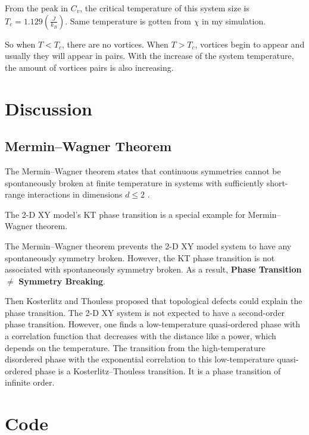 \documentclass[a4paper]{article}
\begin{document}
From the peak in $C_v$, the critical temperature of this system size is $T_c = 1.129 (\displaystyle \frac{J}{k_B})$. Same temperature is gotten from $\chi$ in my simulation.

So when $T < T_c$, there are no vortices. When $T > T_c$, vortices begin to appear and usually they will appear in pairs. With the increase of the system temperature, the amount of vortices pairs is also increasing.

\section{Discussion}

\subsection{Mermin–Wagner Theorem}

The Mermin–Wagner theorem states that continuous symmetries cannot be spontaneously broken at finite temperature in systems with sufficiently short-range interactions in dimensions $d \leq 2$ \cite{mermin1966absence}. 

The 2-D XY model's KT phase transition is a special example for Mermin–Wagner theorem.

The Mermin–Wagner theorem prevents the 2-D XY model system to have any spontaneously symmetry broken. However, the KT phase transition is not associated with spontaneously symmetry broken. As a result, \textbf{Phase Transition} $\neq$ \textbf{Symmetry Breaking}.

Then Kosterlitz and Thouless proposed that topological defects could explain the phase transition. The 2-D XY system is not expected to have a second-order phase transition. However, one finds a low-temperature quasi-ordered phase with a correlation function that decreases with the distance like a power, which depends on the temperature. The transition from the high-temperature disordered phase with the exponential correlation to this low-temperature quasi-ordered phase is a Kosterlitz–Thouless transition. It is a phase transition of infinite order.



\section{Code}


\end{document}
